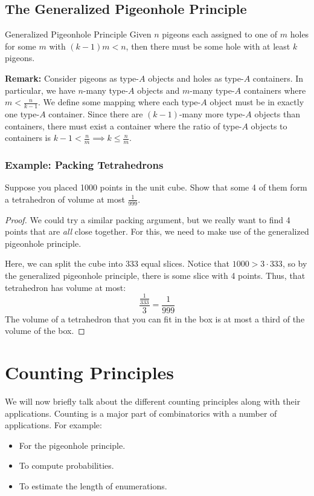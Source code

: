 \documentclass[letterpaper]{article}
\begin{document}
\subsection{The Generalized Pigeonhole Principle}
\begin{theorem}{Generalized Pigeonhole Principle}{}
    Given $n$ pigeons each assigned to one of $m$ holes for some $m$ with $(k - 1)m < n$, then there must be some hole with at least $k$ pigeons. 
\end{theorem}
\textbf{Remark:} Consider pigeons as type-$A$ objects and holes as type-$A$ containers. In particular, we have $n$-many type-$A$ objects and $m$-many type-$A$ containers where $m < \frac{n}{k - 1}$. We define some mapping where each type-$A$ object must be in exactly one type-$A$ container. Since there are $(k - 1)$-many more type-$A$ objects than containers, there must exist a container where the ratio of type-$A$ objects to containers is $k - 1 < \frac{n}{m} \implies k \leq \frac{n}{m}$. 

\subsubsection{Example: Packing Tetrahedrons}
Suppose you placed 1000 points in the unit cube. Show that some 4 of them form a tetrahedron of volume at most $\frac{1}{999}$.

\begin{proof}
    We could try a similar packing argument, but we really want to find 4 points that are \emph{all} close together. For this, we need to make use of the generalized pigeonhole principle.

    \bigskip 

    Here, we can split the cube into 333 equal slices. Notice that $1000 > 3 \cdot 333$, so by the generalized pigeonhole principle, there is some slice with 4 points. Thus, that tetrahedron has volume at most:
    \[\frac{\frac{1}{333}}{3} = \frac{1}{999}\]
    The volume of a tetrahedron that you can fit in the box is at most a third of the volume of the box. 
\end{proof}








\newpage 
\section{Counting Principles}
We will now briefly talk about the different counting principles along with their applications. Counting is a major part of combinatorics with a number of applications. For example:
\begin{itemize}
    \item For the pigeonhole principle.
    \item To compute probabilities. 
    \item To estimate the length of enumerations. 
\end{itemize}
\end{document}
